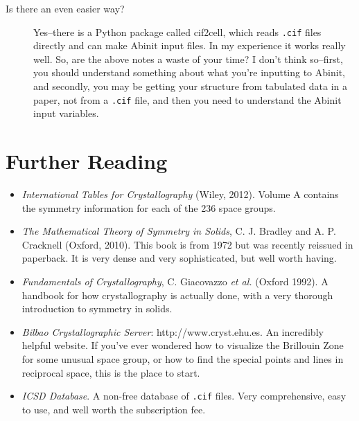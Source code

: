 \documentclass{article}
\begin{document}
\begin{description}
\item[Is there an even easier way?] Yes--there is a {\sc Python} package called {\sc cif2cell}, which reads {\tt .cif} files
directly and can make {\sc Abinit} input files. In my experience it works really well. So, are the above notes a waste of your
time? I don't think so--first, you should understand something about what you're inputting to {\sc Abinit}, and secondly, you may 
be getting your structure from tabulated data in a paper, not from a {\tt .cif} file, and then you need to understand the
{\sc Abinit} input variables.

\end{description}

\section{Further Reading}
\begin{itemize}
\item {\em International Tables for Crystallography} (Wiley, 2012). Volume A contains the symmetry information for each of the
236 space groups.

\item {\em The Mathematical Theory of Symmetry in Solids}, C. J. Bradley and A. P. Cracknell (Oxford, 2010). This book is from
1972 but was recently reissued in paperback. It is very dense and very sophisticated, but well worth having.

\item {\em Fundamentals of Crystallography}, C. Giacovazzo {\em et al.} (Oxford 1992). A handbook for how crystallography is
actually done, with a very thorough introduction to symmetry in solids.

\item {\em Bilbao Crystallographic Server}: http://www.cryst.ehu.es. An incredibly helpful website. If you've ever wondered how
to visualize the Brillouin Zone for some unusual space group, or how to find the special points and lines in reciprocal space,
this is the place to start.

\item {\em ICSD Database}. A non-free database of {\tt .cif} files. Very comprehensive, easy to use, and well worth the subscription
fee.

\end{itemize}
\end{document}
